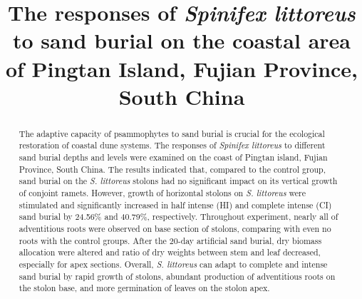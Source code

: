 \documentclass[]{interact}
\theoremstyle{plain}%
\theoremstyle{definition}
\theoremstyle{remark}
\begin{document}

\title{The responses of \textit{\textit{Spinifex littoreus}} to sand burial on the coastal area of Pingtan Island, Fujian Province, South China}

\author{
}

\maketitle

\begin{abstract}
\label{abstract}
The adaptive capacity of psammophytes to sand burial is crucial for the ecological restoration of coastal dune systems. 
The responses of \textit{Spinifex littoreus} to different sand burial depths and levels were examined on the coast of Pingtan island, Fujian Province, South China. 
The results indicated that, compared to the control group, sand burial on the \textit{S. littoreus} stolons had no significant impact on its vertical growth of conjoint ramets. 
However, growth of horizontal stolons on \textit{S. littoreus} were stimulated and significantly increased in half intense (HI) and complete intense (CI) sand burial by 24.56\% and 40.79\%, respectively. 
Throughout experiment, nearly all of adventitious roots were observed on base section of stolons, comparing with even no roots with the control groups. 
After the 20-day artificial sand burial, dry biomass allocation were altered and ratio of dry weights between stem and leaf decreased, especially for apex sections. 
Overall, \textit{S. littoreus} can adapt to complete and intense sand burial by rapid growth of stolons, abundant production of adventitious roots on the stolon base, and more germination of leaves on the stolon apex.
\end{abstract}
\end{document}
